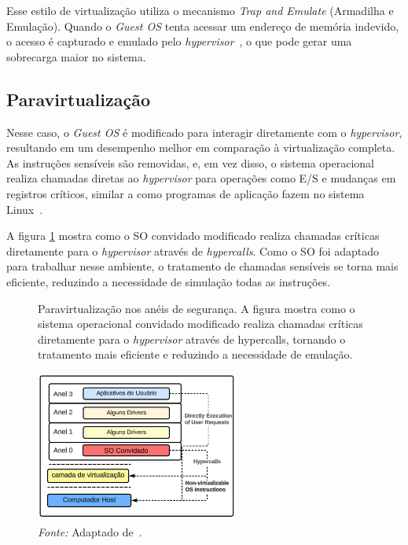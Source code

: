 Esse estilo de virtualização utiliza o mecanismo \textit{Trap and Emulate} (Armadilha e Emulação). Quando o \textit{Guest OS} tenta acessar um endereço de memória indevido, o acesso é capturado e emulado pelo \textit{hypervisor}~\citep{chirammal2016mastering}, o que pode gerar uma sobrecarga maior no sistema.

\subsection{Paravirtualização}

Nesse caso, o \textit{Guest OS} é modificado para interagir diretamente com o \textit{hypervisor}, resultando em um desempenho melhor em comparação à virtualização completa. As instruções sensíveis são removidas, e, em vez disso, o sistema operacional realiza chamadas diretas ao \textit{hypervisor} para operações como E/S e mudanças em registros críticos, similar a como programas de aplicação fazem no sistema Linux~\citep{modernOS}.

A figura \ref{fig:paravirtualization_rings} mostra como o SO convidado modificado realiza chamadas críticas diretamente para o \textit{hypervisor} através de \textit{hypercalls}. Como o SO foi adaptado para trabalhar nesse ambiente, o tratamento de chamadas sensíveis se torna mais eficiente, reduzindo a necessidade de simulação todas as instruções.

\begin{figure}[htbp]
  \centering
  \caption{Paravirtualização nos anéis de segurança. A figura mostra como o sistema operacional convidado modificado realiza chamadas críticas diretamente para o \textit{hypervisor} através de hypercalls, tornando o tratamento mais eficiente e reduzindo a necessidade de emulação.}
  \includegraphics[width=0.6\textwidth]{images/paravirtualization_rings.png}
  \caption*{\textit{Fonte:} Adaptado de~\citep{chirammal2016mastering}.}
  \label{fig:paravirtualization_rings}
\end{figure}

